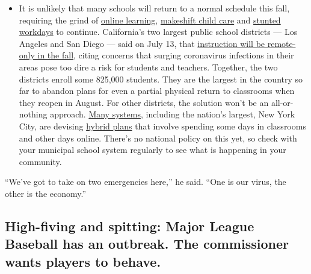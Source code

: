 \begin{itemize}
  \begin{itemize}
  \tightlist
  \item
    It is unlikely that many schools will return to a normal schedule
    this fall, requiring the grind of
    \href{https://www.nytimes3xbfgragh.onion/2020/06/05/us/coronavirus-education-lost-learning.html?action=click\&pgtype=Article\&state=default\&region=MAIN_CONTENT_3\&context=storylines_faq}{online
    learning},
    \href{https://www.nytimes3xbfgragh.onion/2020/05/29/us/coronavirus-child-care-centers.html?action=click\&pgtype=Article\&state=default\&region=MAIN_CONTENT_3\&context=storylines_faq}{makeshift
    child care} and
    \href{https://www.nytimes3xbfgragh.onion/2020/06/03/business/economy/coronavirus-working-women.html?action=click\&pgtype=Article\&state=default\&region=MAIN_CONTENT_3\&context=storylines_faq}{stunted
    workdays} to continue. California's two largest public school
    districts --- Los Angeles and San Diego --- said on July 13, that
    \href{https://www.nytimes3xbfgragh.onion/2020/07/13/us/lausd-san-diego-school-reopening.html?action=click\&pgtype=Article\&state=default\&region=MAIN_CONTENT_3\&context=storylines_faq}{instruction
    will be remote-only in the fall}, citing concerns that surging
    coronavirus infections in their areas pose too dire a risk for
    students and teachers. Together, the two districts enroll some
    825,000 students. They are the largest in the country so far to
    abandon plans for even a partial physical return to classrooms when
    they reopen in August. For other districts, the solution won't be an
    all-or-nothing approach.
    \href{https://bioethics.jhu.edu/research-and-outreach/projects/eschool-initiative/school-policy-tracker/}{Many
    systems}, including the nation's largest, New York City, are
    devising
    \href{https://www.nytimes3xbfgragh.onion/2020/06/26/us/coronavirus-schools-reopen-fall.html?action=click\&pgtype=Article\&state=default\&region=MAIN_CONTENT_3\&context=storylines_faq}{hybrid
    plans} that involve spending some days in classrooms and other days
    online. There's no national policy on this yet, so check with your
    municipal school system regularly to see what is happening in your
    community.
  \end{itemize}
\end{itemize}

``We've got to take on two emergencies here,'' he said. ``One is our
virus, the other is the economy.''

\hypertarget{high-fiving-and-spitting-major-league-baseball-has-an-outbreak-the-commissioner-wants-players-to-behave}{%
\subsection{High-fiving and spitting: Major League Baseball has an
outbreak. The commissioner wants players to
behave.}\label{high-fiving-and-spitting-major-league-baseball-has-an-outbreak-the-commissioner-wants-players-to-behave}}

